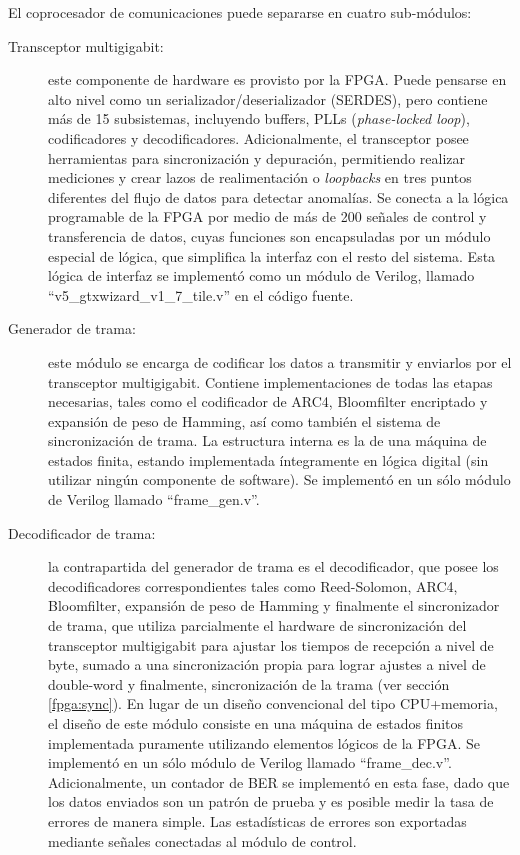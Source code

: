 El coprocesador de comunicaciones puede separarse en cuatro sub-módulos:

\begin{description}
 \item[Transceptor multigigabit:] este componente de hardware es provisto por la FPGA. Puede pensarse en alto nivel como un serializador/deserializador (SERDES), pero contiene más de 15 subsistemas, incluyendo buffers, PLLs (\textit{phase-locked loop}), codificadores y decodificadores. Adicionalmente, el transceptor posee herramientas para sincronización y depuración, permitiendo realizar mediciones y crear lazos de realimentación o \textit{loopbacks} en tres puntos diferentes del flujo de datos para detectar anomalías. Se conecta a la lógica programable de la FPGA por medio de más de 200 señales de control y transferencia de datos, cuyas funciones son encapsuladas por un módulo especial de lógica, que simplifica la interfaz con el resto del sistema. Esta lógica de interfaz se implementó como un módulo de Verilog, llamado ``v5\_gtxwizard\_v1\_7\_tile.v'' en el código fuente.

 \item[Generador de trama:] este módulo se encarga de codificar los datos a transmitir y enviarlos por el transceptor multigigabit. Contiene implementaciones de todas las etapas necesarias, tales como el codificador de ARC4, Bloomfilter encriptado y expansión de peso de Hamming, así como también el sistema de sincronización de trama. La estructura interna es la de una máquina de estados finita, estando implementada íntegramente en lógica digital (sin utilizar ningún componente de software). Se implementó en un sólo módulo de Verilog llamado ``frame\_gen.v''.
 
 \item[Decodificador de trama:] la contrapartida del generador de trama es el decodificador, que posee los decodificadores correspondientes tales como Reed-Solomon, ARC4, Bloomfilter, expansión de peso de Hamming y finalmente el sincronizador de trama, que utiliza parcialmente el hardware de sincronización del transceptor multigigabit para ajustar los tiempos de recepción a nivel de byte, sumado a una sincronización propia para lograr ajustes a nivel de double-word y finalmente, sincronización de la trama (ver sección \ref{fpga:sync}). En lugar de un diseño convencional del tipo CPU+memoria, el diseño de este módulo consiste en una máquina de estados finitos implementada puramente utilizando elementos lógicos de la FPGA. Se implementó en un sólo módulo de Verilog llamado ``frame\_dec.v''. Adicionalmente, un contador de BER se implementó en esta fase, dado que los datos enviados son un patrón de prueba y es posible medir la tasa de errores de manera simple. Las estadísticas de errores son exportadas mediante señales conectadas al módulo de control.
 
 \end{description}

